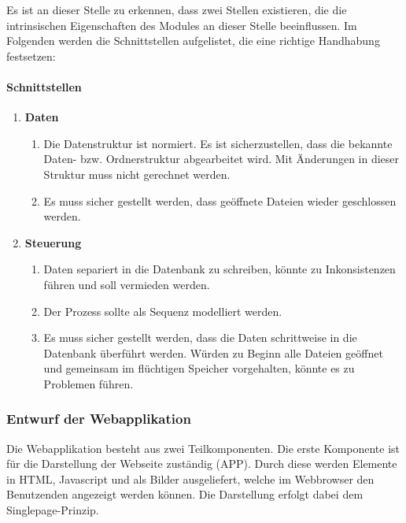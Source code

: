 Es ist an dieser Stelle zu erkennen, dass zwei Stellen existieren, die die intrinsischen Eigenschaften des Modules an dieser Stelle beeinflussen. Im Folgenden werden die Schnittstellen aufgelistet, die eine richtige Handhabung festsetzen:

\pagebreak
\paragraph{Schnittstellen}

\begin{enumerate}

\item \textbf{Daten}
    \begin{enumerate}
        \item Die Datenstruktur ist normiert. Es ist sicherzustellen, dass die bekannte Daten- bzw. Ordnerstruktur abgearbeitet wird. Mit Änderungen in dieser Struktur muss nicht gerechnet werden.
        \item Es muss sicher gestellt werden, dass geöffnete Dateien wieder geschlossen werden.
    \end{enumerate}

\item \textbf{Steuerung}
    \begin{enumerate}
        \item Daten separiert in die Datenbank zu schreiben, könnte zu Inkonsistenzen führen und soll vermieden werden.
        \item Der Prozess sollte als Sequenz modelliert werden.
        \item Es muss sicher gestellt werden, dass die Daten schrittweise in die Datenbank überführt werden. Würden zu Beginn alle Dateien geöffnet und gemeinsam im flüchtigen Speicher vorgehalten, könnte es zu Problemen führen.
    \end{enumerate}

\end{enumerate}



\subsubsection{Entwurf der Webapplikation}

Die Webapplikation besteht aus zwei Teilkomponenten. Die erste Komponente ist für die Darstellung der Webseite zuständig (APP). Durch diese werden Elemente in  HTML, Javascript und als Bilder ausgeliefert, welche im Webbrowser den Benutzenden angezeigt werden können. Die Darstellung erfolgt dabei dem Singlepage-Prinzip.

